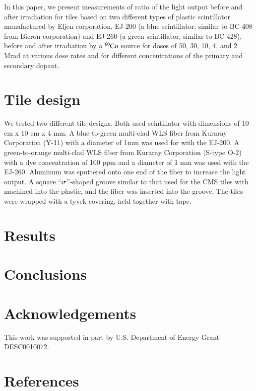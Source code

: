 \documentclass[review]{elsarticle}
\begin{document}
In this paper, we present measurements of ratio of the light output before and after irradiation
for tiles based on two different types of plastic scintillator manufactured by Eljen corporation, EJ-200 (a blue scintillator, 
similar to BC-408 from Bicron corporation) 
and 
EJ-260 (a green scintillator, similar to BC-428), before and after irradiation by a $\rm {^{60}Co}$ source for doses of 50, 30, 10, 4, and 2 Mrad at various dose rates and for different concentrations of the primary and secondary dopant.


\section{Tile design}
We tested two different tile designs.  Both used scintillator
with dimensions of 10 cm x 10 cm x 4 mm.  A blue-to-green multi-clad WLS fiber
from Kuraray Corporation (Y-11) with a diameter of 1mm was used for with the EJ-200.  A green-to-orange multi-clad WLS fiber from Kuraray Corporation 
(S-type O-2) with a dye concentration of 100 ppm and a diameter of 1 mm was used with the EJ-260.  Aluminum was sputtered onto one end of the fiber
to increase the light output.
A square ``${\rm \sigma}$''-shaped groove similar to that used for the 
CMS tiles with machined into the plastic, and the fiber was inserted
into the groove.  The tiles were wrapped with a tyvek covering, held together with tape.



\section{Results}

\section{Conclusions}

\section{Acknowledgements}

This work was supported in part by U.S. Department of Energy Grant DESC0010072.

\section*{References}


\end{document}
